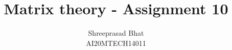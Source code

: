 \documentclass[journal,12pt,twocolumn]{IEEEtran}
\begin{document}
\makeatletter
{}
\makeatother
\let\StandardTheFigure\thefigure
\let\vec\mathbf
\renewcommand{\thefigure}{\theproblem}
\def\putbox#1#2#3{\makebox[0in][l]{\makebox[#1][l]{}\raisebox{\baselineskip}[0in][0in]{\raisebox{#2}[0in][0in]{#3}}}}
     \def\rightbox#1{\makebox[0in][r]{#1}}
     \def\centbox#1{\makebox[0in]{#1}}
     \def\topbox#1{\raisebox{-\baselineskip}[0in][0in]{#1}}
     \def\midbox#1{\raisebox{-0.5\baselineskip}[0in][0in]{#1}}
\vspace{3cm}
\title{Matrix theory - Assignment 10}
\author{Shreeprasad Bhat\\AI20MTECH14011}
%
%
%
% 
%
\end{document}
